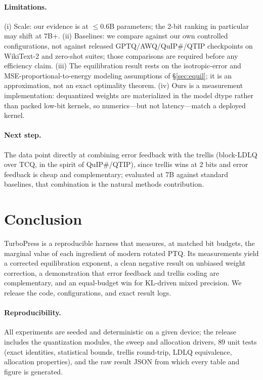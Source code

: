 \documentclass[11pt]{article}
\begin{document}
\paragraph{Limitations.} (i) Scale: our evidence is at $\le0.6$B parameters; the
2-bit ranking in particular may shift at 7B+. (ii) Baselines: we compare against
our own controlled configurations, not against released GPTQ/AWQ/QuIP\#/QTIP
checkpoints on WikiText-2 and zero-shot suites; those comparisons are required
before any efficiency claim. (iii) The equilibration result rests on the
isotropic-error and MSE-proportional-to-energy modeling assumptions of
\S\ref{sec:equil}; it is an approximation, not an exact optimality theorem.
(iv) Ours is a measurement implementation: dequantized weights are materialized
in the model dtype rather than packed low-bit kernels, so numerics---but not
latency---match a deployed kernel.
\paragraph{Next step.} The data point directly at combining error feedback with
the trellis (block-LDLQ over TCQ, in the spirit of QuIP\#/QTIP), since trellis
wins at 2 bits and error feedback is cheap and complementary; evaluated at 7B
against standard baselines, that combination is the natural methods contribution.

\section{Conclusion}
TurboPress is a reproducible harness that measures, at matched bit budgets, the
marginal value of each ingredient of modern rotated PTQ. Its measurements yield
a corrected equilibration exponent, a clean negative result on unbiased weight
correction, a demonstration that error feedback and trellis coding are
complementary, and an equal-budget win for KL-driven mixed precision. We release
the code, configurations, and exact result logs.

\paragraph{Reproducibility.} All experiments are seeded and deterministic on a
given device; the release includes the quantization modules, the sweep and
allocation drivers, $89$ unit tests (exact identities, statistical bounds,
trellis round-trip, LDLQ equivalence, allocation properties), and the raw result
JSON from which every table and figure is generated.



\end{document}
